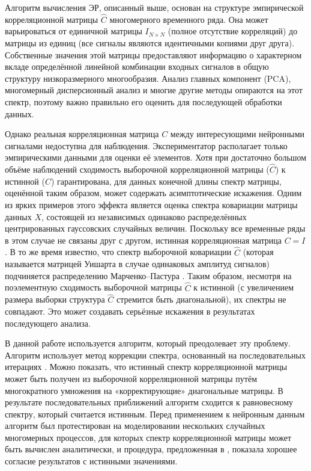 Алгоритм вычисления ЭР, описанный выше, основан на структуре эмпирической корреляционной матрицы $\hat C$ многомерного временного ряда. Она может варьироваться от единичной матрицы $I_{N \times N}$ (полное отсутствие корреляций) до матрицы из единиц (все сигналы являются идентичными копиями друг друга).
Собственные значения этой матрицы предоставляют информацию о характерном вкладе определённой линейной комбинации входных сигналов в общую структуру низкоразмерного многообразия.
Анализ главных компонент (PCA), многомерный дисперсионный анализ и многие другие методы опираются на этот спектр, поэтому важно правильно его оценить для последующей обработки данных.

Однако реальная корреляционная матрица $C$ между интересующими нейронными сигналами недоступна для наблюдения. Экспериментатор располагает только эмпирическими данными для оценки её элементов. Хотя при достаточно большом объёме наблюдений сходимость выборочной корреляционной матрицы ($\hat C$) к истинной ($C$) гарантирована, для данных конечной длины спектр матрицы, оценённой таким образом, может содержать асимптотические искажения. Одним из ярких примеров этого эффекта является оценка спектра ковариации матрицы данных $X$, состоящей из независимых одинаково распределённых центрированных гауссовских случайных величин. Поскольку все временные ряды в этом случае не связаны друг с другом, истинная корреляционная матрица $C = I$. В то же время известно, что спектр выборочной ковариации $\hat C$ (которая называется матрицей Уишарта в случае одинаковых амплитуд сигналов) подчиняется распределению Марченко--Пастура \cite{mp}. Таким образом, несмотря на поэлементную сходимость выборочной матрицы $\hat C$ к истинной (с увеличением размера выборки структура $\hat C$ стремится быть диагональной), их спектры не совпадают. Это может создавать серьёзные искажения в результатах последующего анализа.

В данной работе используется алгоритм, который преодолевает эту проблему.
Алгоритм использует метод коррекции спектра, основанный на последовательных итерациях \cite{spcorr}. Можно показать, что истинный спектр корреляционной матрицы может быть получен из выборочной корреляционной матрицы путём многократного умножения на «корректирующие» диагональные матрицы. В результате последовательных приближений алгоритм сходится к равновесному спектру, который считается истинным. Перед применением к нейронным данным алгоритм был протестирован на моделировании нескольких случайных многомерных процессов, для которых спектр корреляционной матрицы может быть вычислен аналитически, и процедура, предложенная в \cite{spcorr}, показала хорошее согласие результатов с истинными значениями.

